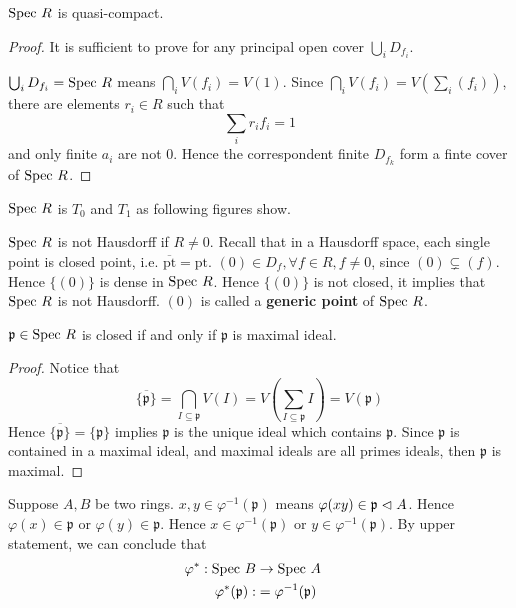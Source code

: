 \begin{secprop}
$\text{Spec } R$ is quasi-compact.
\end{secprop}
\begin{proof}
	It is sufficient to prove for any principal open cover $\bigcup_i D_{f_i}$.
	
	$\bigcup_i D_{f_i} =\text{Spec } R$ means $\bigcap_i V(f_i) = V(1)$. Since $\bigcap_i V(f_i)= V(\sum_i (f_i))$, there are elements $r_i \in R$ such that 
	\[
	\sum_i r_i f_i = 1
	\] and only finite $a_i$ are not 0. Hence the correspondent finite $D_{f_k}$ form a finte cover of $\text{Spec } R$.
\end{proof}
\begin{secprop}
	$\text{Spec } R$ is $T_0$ and $T_1$ as following figures show.
\end{secprop}
\begin{rem}
	$\text{Spec } R$ is not Hausdorff if $R \neq 0$. Recall that in a Hausdorff space, each single point is closed point, i.e. $\overline{\text{pt}} = \text{pt}$. $(0) \in D_f, \forall f \in R, f \neq 0$, since $(0) \subsetneq (f)$. Hence $\{(0)\}$ is dense in $\text{Spec } R$. Hence $\{(0)\}$ is not closed, it implies that $\text{Spec } R$ is not Hausdorff. $(0)$ is called a \textbf{generic point} of $\text{Spec } R$.
\end{rem}
\begin{secprop}
	$\mathfrak{p} \in \text{Spec } R$ is closed if and only if $\mathfrak{p}$ is maximal ideal.
\end{secprop}
\begin{proof}
	Notice that 
	\[
	\overline{\{\mathfrak{p}\}} = \bigcap_{I \subseteq \mathfrak{p}}V(I) = V(\sum_{I \subseteq \mathfrak{p}}I) = V(\mathfrak{p})
	\]
	Hence $\overline{\{\mathfrak{p}\}}= \{ \mathfrak{p} \}$ implies $\mathfrak{p}$ is the unique ideal which contains $\mathfrak{p}$. Since $\mathfrak{p}$ is contained in a maximal ideal, and maximal ideals are all primes ideals, then $\mathfrak{p}$ is maximal.
\end{proof}
Suppose $A, B$ be two rings. $x,y \in \varphi^{-1} (\mathfrak{p})$ means $\varphi(xy) \in \mathfrak{p} \vartriangleleft A$. Hence $\varphi(x) \in \mathfrak{p}$ or $\varphi(y) \in \mathfrak{p}$. Hence $x \in \varphi^{-1} ( \mathfrak{p})$ or $y \in \varphi^{-1}(\mathfrak{p})$. 
By upper statement, we can conclude that
\[
\begin{aligned}
	\varphi^* : \text{Spec } B &\rightarrow \text{Spec } A&\\
	\varphi^* (\mathfrak{p}) : &= \varphi^{-1}(\mathfrak{p})
\end{aligned}
\]
